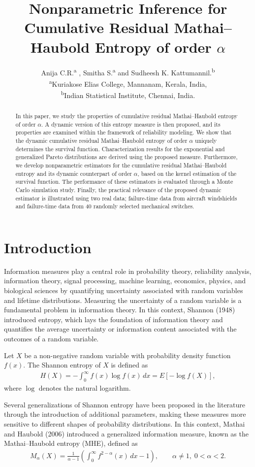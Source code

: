 \documentclass[11pt,reqno]{amsart}
\title[Cumulative Residual Mathai--Haubold Entropy]{Nonparametric Inference for Cumulative Residual Mathai--Haubold Entropy of order $\alpha$ }
\author[]{A\lowercase{nija} C.R.\lowercase{\textsuperscript{a}} , S\lowercase{mitha} S.\lowercase{\textsuperscript{a}} \lowercase{and} S\lowercase{udheesh} K. K\lowercase{attumannil.\textsuperscript{b}}
\\
\lowercase{\textsuperscript{a}}K\lowercase{uriakose} E\lowercase{lias} C\lowercase{ollege},
  M\lowercase{annanam},
  K\lowercase{erala},
  I\lowercase{ndia,}\\
\lowercase{\textsuperscript{b}}I\lowercase{ndian} S\lowercase{tatistical} I\lowercase{nstitute},
  C\lowercase{hennai}, I\lowercase{ndia.}}
\theoremstyle{tight}
\begin{document}
\maketitle
\doublespacing
\vspace{-0.2in}

\begin{abstract}
 In this paper, we study the properties of cumulative residual Mathai--Haubold entropy of order $\alpha$. A dynamic version of this entropy measure is then proposed, and its properties are examined within the framework of reliability modeling. We show that the dynamic cumulative residual Mathai--Haubold entropy of order $\alpha$ uniquely determines the survival function. Characterization results for the exponential and generalized Pareto distributions are derived using the proposed measure. Furthermore, we develop nonparametric estimators for the cumulative residual Mathai--Haubold entropy and its dynamic counterpart of order $\alpha$, based on the kernel estimation of the survival function. The performance of these estimators is evaluated through a Monte Carlo simulation study. Finally, the practical relevance of the proposed dynamic estimator is illustrated using two real data; failure-time data from aircraft windshields and failure-time data from 40 randomly selected mechanical switches.
\end{abstract}
\doublespacing
\section{Introduction}
Information measures play a central role in probability theory, reliability analysis, information theory, signal processing, machine learning, economics, physics, and biological sciences by quantifying uncertainty associated with random variables and lifetime distributions.
Measuring the uncertainty of a random variable is a fundamental problem in information theory. In this context, Shannon (1948) introduced entropy, which lays the foundation of information theory and quantifies the average uncertainty or information content associated with the outcomes of a random variable.


 Let $X$ be a non-negative random variable with probability density function $f(x)$. The Shannon entropy of $X$ is defined as
\begin{align}\label{entropy}
H(X) = -\int_{0}^{\infty} f(x) \log f(x) \, dx = E[-\log f(X)],
\end{align}
where $\log$ denotes the natural logarithm.
\par Several generalizations of Shannon entropy have been proposed in the literature through the introduction of additional parameters, making these measures more sensitive to different shapes of probability distributions. In this context, Mathai and Haubold (2006) introduced a generalized information measure, known as the Mathai--Haubold entropy (MHE), defined as
\begin{align}\label{MHE}
M_{\alpha}(X) = \frac{1}{\alpha-1}\left( \int_{0}^{\infty} f^{2-\alpha}(x)\,dx - 1 \right),
\qquad \alpha \neq 1,\; 0<\alpha<2.
\end{align}
\end{document}
